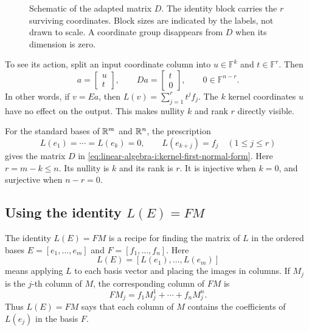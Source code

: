 \begin{figure}[ht]
  \centering
  
  \caption[Matrix adapted to the kernel and image]{Schematic of the adapted matrix \(D\).
    The identity block carries the \(r\) surviving coordinates.
    Block sizes are indicated by the labels, not drawn to scale.
    A coordinate group disappears from \(D\) when its dimension is zero.}
  \label{fig:linear-algebra-i:adapted-basis-blocks}
\end{figure}

\begin{samepage}
To see its action, split an input coordinate column into
\(u\in\mathbb F^k\) and \(t\in\mathbb F^r\). Then
\[
  a=\begin{bmatrix}u\\t\end{bmatrix},
  \qquad
  Da=\begin{bmatrix}t\\0\end{bmatrix},
  \qquad 0\in\mathbb F^{n-r}.
\]
In other words, if \(v=Ea\), then
\(L(v)=\sum_{j=1}^r t^j f_j\).
The \(k\) kernel coordinates \(u\) have no effect on the output.
This makes nullity \(k\) and rank \(r\) directly visible.
\par
\end{samepage}

\begin{example}
  For the standard bases of \(\mathbb{R}^m\) and \(\mathbb{R}^n\), the prescription
  \[
    L(e_1)=\cdots=L(e_k)=0,\qquad L(e_{k+j})=f_j\quad(1\leq j\leq r)
  \]
  gives the matrix \(D\) in
  \autoref{eq:linear-algebra-i:kernel-first-normal-form}.
  Here \(r=m-k\leq n\). Its nullity is \(k\) and its rank is \(r\).
  It is injective when \(k=0\), and surjective when \(n-r=0\).
\end{example}



\subsection{Using the identity \(L(E)=FM\)}

The identity \(L(E)=FM\) is a recipe for finding the matrix of \(L\)
in the ordered bases \(E=[e_1,\ldots,e_m]\) and \(F=[f_1,\ldots,f_n]\).
Here
\[
  L(E)=[L(e_1),\ldots,L(e_m)]
\]
means applying \(L\) to each basis vector and placing the images in
columns. If \(M_j\) is the \(j\)-th column of \(M\), the corresponding
column of \(FM\) is
\[
  FM_j=f_1M^1_j+\cdots+f_nM^n_j.
\]
Thus \(L(E)=FM\) says that each column of \(M\) contains the
coefficients of \(L(e_j)\) in the basis \(F\).

